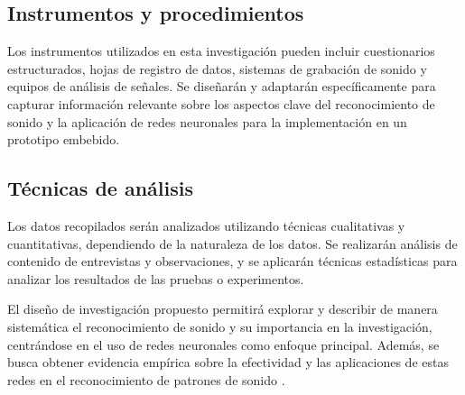 \subsection{Instrumentos y procedimientos}
Los instrumentos utilizados en esta investigación pueden incluir cuestionarios estructurados, hojas de registro de datos, sistemas de grabación de sonido y equipos de análisis de señales. Se diseñarán y adaptarán específicamente para capturar información relevante sobre los aspectos clave del reconocimiento de sonido y la aplicación de redes neuronales para la implementación en un prototipo embebido.

\subsection{Técnicas de análisis}
Los datos recopilados serán analizados utilizando técnicas cualitativas y cuantitativas, dependiendo de la naturaleza de los datos. Se realizarán análisis de contenido de entrevistas y observaciones, y se aplicarán técnicas estadísticas para analizar los resultados de las pruebas o experimentos.

El diseño de investigación propuesto permitirá explorar y describir de manera sistemática el reconocimiento de sonido y su importancia en la investigación, centrándose en el uso de redes neuronales como enfoque principal. Además, se busca obtener evidencia empírica sobre la efectividad y las aplicaciones de estas redes en el reconocimiento de patrones de sonido \cite{ues, martinez, osorio, frro2, apple}.
